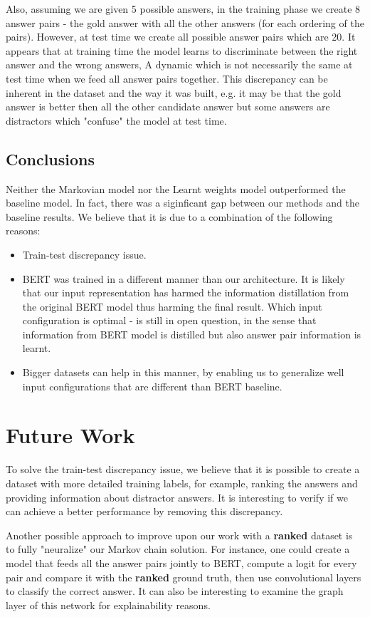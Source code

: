 \documentclass{article}
\begin{document}
Also, assuming we are given 5 possible answers, in the training phase we create 8 answer pairs - the gold answer with all the other answers (for each ordering of the pairs). However, at test time we create all possible answer pairs which are 20. It appears that at training time the model learns to discriminate between the right answer and the wrong answers, A dynamic which is not necessarily the same at test time when we feed all answer pairs together. This discrepancy can be inherent in the dataset and the way it was built, e.g. it may be that the gold answer is better then all the other candidate answer but some answers are distractors which "confuse" the model at test time.

\subsection{Conclusions}
Neither the Markovian model nor the Learnt weights model outperformed the baseline model. In fact, there was a siginficant gap between our methods and the baseline results. We believe that it is due to a combination of the following reasons:
\begin{itemize}
\item Train-test discrepancy issue.
\item BERT was trained in a different manner than our architecture. It is likely  that our input representation has harmed the information distillation from the original BERT model thus harming the final result. Which input configuration is optimal - is still in open question, in the sense that information from BERT model is distilled but also answer pair information is learnt. 
\item  Bigger datasets can help in this manner, by enabling us to generalize well input configurations that are different than BERT baseline.
\end{itemize}

\section{Future Work}
To solve the train-test discrepancy issue, we believe that it is possible to create a dataset with more detailed training labels, for example, ranking the answers and providing information about distractor answers. It is interesting to verify if we can achieve a better performance by removing this discrepancy.

Another possible approach to improve upon our work with a \textbf{ranked} dataset is to fully "neuralize" our Markov chain solution. For instance, one could create a model that feeds all the answer pairs jointly to  BERT, compute a logit for every pair and compare it with the \textbf{ranked} ground truth, then use convolutional layers to classify the correct answer. It can also be interesting to examine the graph layer of this network for explainability reasons.  
\end{document}
